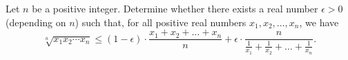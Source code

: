 Let $n$ be a positive integer.
Determine whether there exists a real number $\epsilon>0$ (depending on $n$) such that,
for all positive real numbers $x_1,x_2,\ldots,x_n$, we have
$$\sqrt[n]{x_1x_2\cdots x_n} \le (1-\epsilon) \cdot \frac{x_1+x_2+\dots + x_n}{n}+\epsilon \cdot
\frac{n}{\frac{1}{x_1}+\frac{1}{x_2}+\dots+\frac{1}{x_n}}.$$
